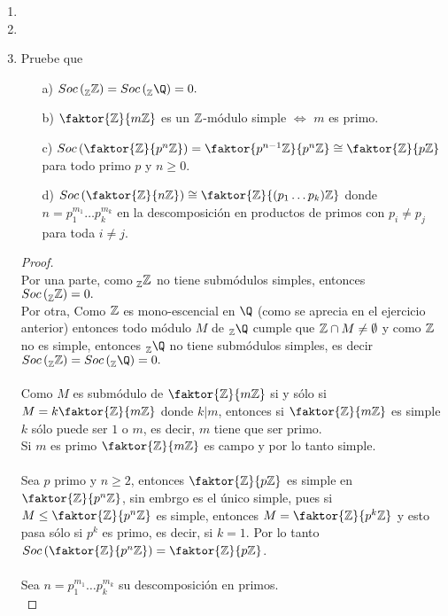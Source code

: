\documentclass{article}
\begin{document}
\begin{enumerate}[label=\textbf{Ej \arabic*.}]
\item
\item
\item Pruebe que 
\begin{itemize}
\item[a)] $Soc\left(\prescript{}{\Z}{\Z}\right)=Soc\left(\prescript{}{\Z}{\Q}\right)=0.$
\item[b)] $\faktor{\Z}{m\Z}$ es un $\mathbb{Z}$-módulo simple $\iff$ $m$ es primo.
\item[c)] $Soc\left(\faktor{\Z}{p^n\Z}\right)=\faktor{p^{n-1}\Z}{p^n\Z}\cong \faktor{\Z}{p\Z}$ para todo primo $p$ y $n\geq 0$.
\item[d)] $Soc\left(\faktor{\Z}{n\Z}\right)\cong \faktor{\Z}{(p_1\ldots p_k)\Z}$ donde $n=p_1^{m_1}\ldots p_k^{m_k}$ en la descomposición
en productos de primos con $p_i\neq p_j$ para toda $i\neq j$.
\end{itemize}
\begin{proof}\\
Por una parte, como $\prescript{}{\mathbb{Z}}{\mathbb{Z}}$ no tiene submódulos simples, entonces\\ $Soc\left(\prescript{}{\mathbb{Z}}{\mathbb{Z}}\right)=0.$\\
Por otra, Como $\mathbb{Z}$ es mono-escencial en $\Q$ (como se aprecia en el ejercicio anterior) entonces todo módulo $M$ de 
$\prescript{}{\Z}{\Q}$ cumple que $\mathbb{Z}\cap M\neq \emptyset$ y como $\mathbb{Z}$ no es simple, entonces $\prescript{}{\Z}{\Q}$ no tiene
submódulos simples, es decir \\$Soc\left(\prescript{}{\Z}{\Z}\right)=Soc\left(\prescript{}{\Z}{\Q}\right)=0.$\\
\\
Como $M$ es submódulo de  $\faktor{\Z}{m\Z}$ si y sólo si $M=k\faktor{\Z}{m\Z}$ donde $k|m$, entonces si $\faktor{\Z}{m\Z}$ es simple
$k$ sólo puede ser $1$ o $m$, es decir, $m$ tiene que ser primo.\\
Si $m$ es primo $\faktor{\Z}{m\Z}$ es campo y por lo tanto simple.\\
\\
Sea $p$ primo y $n\geq 2$, entonces $\faktor{\Z}{p\Z}$ es simple en $\faktor{\Z}{p^n\Z}$, sin embrgo es el único simple, pues
si $M\leq \faktor{\Z}{p^n\Z}$ es simple, entonces $M=\faktor{\Z}{p^k\Z}$ y esto pasa sólo si $p^k$  es primo, es decir, si $k=1$.
Por lo tanto \\$Soc\left(\faktor{\Z}{p^n\Z}\right)=\faktor{\Z}{p\Z}$.\\
\\
Sea $n=p_1^{m_1}\ldots p_k^{m_k}$ su descomposición en primos.\\

\end{proof}
\end{enumerate}
\end{document}
